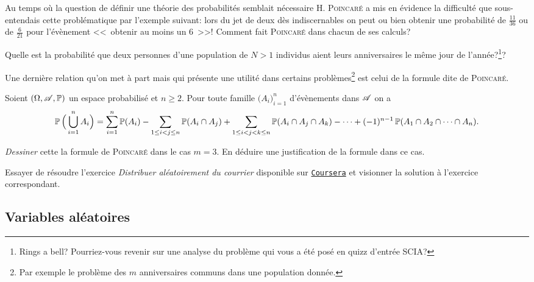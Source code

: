 \documentclass[11pt, a4paper]{article}
\begin{document}
\begin{question}
  Au temps où la question de définir une théorie des probabilités
  semblait nécessaire \textsc{H. Poincaré} a mis en évidence la
  difficulté que sous-entendais cette problématique par l'exemple
  suivant: lors du jet de deux dès indiscernables on peut ou bien
  obtenir une probabilité de $\frac{11}{36}$ ou de $\frac{6}{21}$ pour
  l'évènement <<\, obtenir au moins un $6$ \,>>!  Comment fait
  \textsc{Poincaré} dans chacun de ses calculs?
\end{question}
\begin{question}
  Quelle est la probabilité que deux personnes d'une population de
  $N > 1$ individus aient leurs anniversaires le même jour de
  l'année?\footnote{Rings a bell? Pourriez-vous revenir sur une
    analyse du problème qui vous a été posé en quizz d'entrée SCIA?}?
\end{question}
Une dernière relation qu'on met à part mais qui présente une utilité
dans certains problèmes\footnote{Par exemple le problème des $m$
  anniversaires communs dans une population donnée.} est celui de la
formule dite de \textsc{Poincaré}.
\begin{prop}
  Soient $(\Omega, \mathscr{A}, \operatorname{\mathbb{P}})$ un espace probabilisé et $n \geq
  2$. Pour toute famille $\big(A_i\big)_{i = 1}^n$ d'évènements dans
  $\mathscr{A}$ on a
  \[
    \operatorname{\mathbb{P}}\Big(\bigcup_{i=1}^n A_i\Big) = \sum_{i=1}^n \operatorname{\mathbb{P}}(A_i) -
    \sum_{1\leq i < j \leq n} \operatorname{\mathbb{P}}(A_i \cap A_j) + \sum_{1\leq i < j < k
      \leq n} \operatorname{\mathbb{P}}(A_i\cap A_j \cap A_k) - \cdots + (-1)^{n-1}\operatorname{\mathbb{P}}(A_1\cap
    A_2 \cap \cdots \cap A_n).
  \]
\end{prop}
\begin{question}
  \textit{Dessiner} cette la formule de \textsc{Poincaré} dans le cas
  $m = 3$. En déduire une justification de la formule dans ce cas.
\end{question}
\begin{question}
  Essayer de résoudre l'exercice \textit{Distribuer aléatoirement du
    courrier} disponible sur
  \href{https://www.coursera.org/learn/probabilites-1/supplement/8Shkn/distribution-aleatoire-du-courrier}{\texttt{Coursera}}
  et visionner la solution à l'exercice correspondant.
\end{question}

\subsection{Variables aléatoires}
\label{sec:va}
\end{document}
